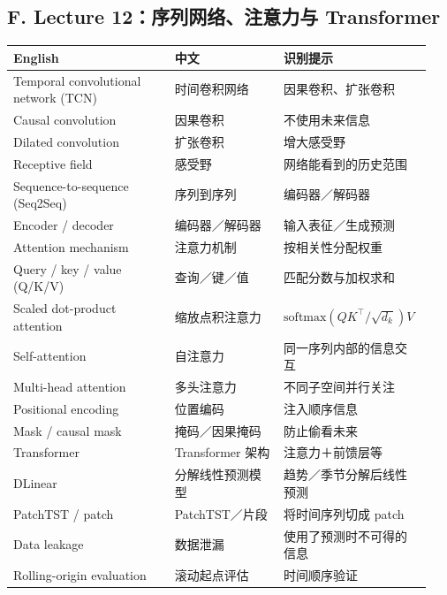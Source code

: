 \documentclass[UTF8,fontset=fandol,10.5pt,a4paper]{ctexart}
\begin{document}
\subsection*{F. Lecture 12：序列网络、注意力与 Transformer}
\begin{longtable}{@{}p{0.37\linewidth}p{0.25\linewidth}p{0.32\linewidth}@{}}
\toprule English & 中文 & 识别提示\\\midrule\endhead
Temporal convolutional network (TCN) & 时间卷积网络 & 因果卷积、扩张卷积\\
Causal convolution & 因果卷积 & 不使用未来信息\\
Dilated convolution & 扩张卷积 & 增大感受野\\
Receptive field & 感受野 & 网络能看到的历史范围\\
Sequence-to-sequence (Seq2Seq) & 序列到序列 & 编码器／解码器\\
Encoder / decoder & 编码器／解码器 & 输入表征／生成预测\\
Attention mechanism & 注意力机制 & 按相关性分配权重\\
Query / key / value (Q/K/V) & 查询／键／值 & 匹配分数与加权求和\\
Scaled dot-product attention & 缩放点积注意力 & $\mathrm{softmax}(QK^\top/\sqrt{d_k})V$\\
Self-attention & 自注意力 & 同一序列内部的信息交互\\
Multi-head attention & 多头注意力 & 不同子空间并行关注\\
Positional encoding & 位置编码 & 注入顺序信息\\
Mask / causal mask & 掩码／因果掩码 & 防止偷看未来\\
Transformer & Transformer 架构 & 注意力＋前馈层等\\
DLinear & 分解线性预测模型 & 趋势／季节分解后线性预测\\
PatchTST / patch & PatchTST／片段 & 将时间序列切成 patch\\
Data leakage & 数据泄漏 & 使用了预测时不可得的信息\\
Rolling-origin evaluation & 滚动起点评估 & 时间顺序验证\\
\bottomrule
\end{longtable}
\end{document}
